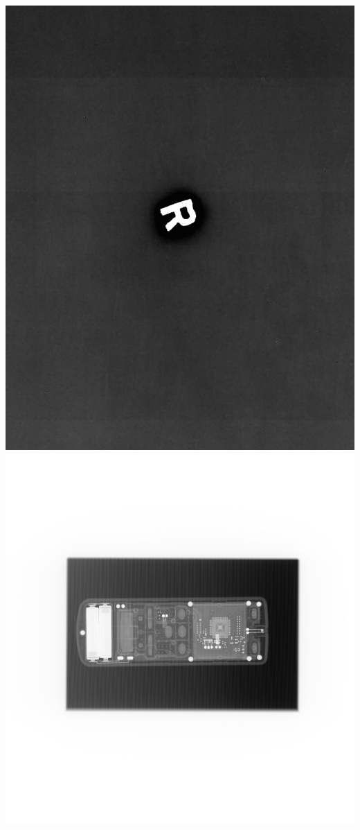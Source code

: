\documentclass[12pt]{article}
\begin{document}
\includegraphics[scale=0.14]{../figures/letter-r.png}
\includegraphics[scale=0.14]{../figures/phone.png}
\end{document}
